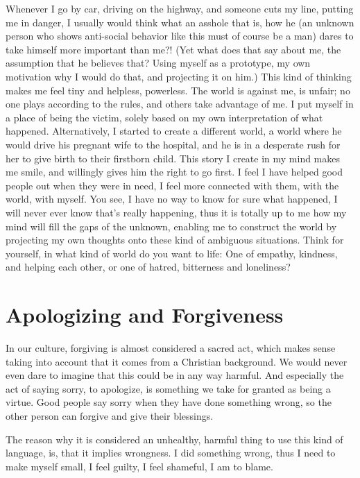 Whenever I go by car, driving on the highway, and someone cuts my line, putting me in danger, I usually would think what an asshole that is, how he (an unknown person who shows anti-social behavior like this must of course be a man) dares to take himself more important than me?!
(Yet what does that say about me, the assumption that he believes that?
Using myself as a prototype, my own motivation why I would do that, and projecting it on him.)
This kind of thinking makes me feel tiny and helpless, powerless.
The world is against me, is unfair; no one plays according to the rules, and others take advantage of me.
I put myself in a place of being the victim, solely based on my own interpretation of what happened.
Alternatively, I started to create a different world, a world where he would drive his pregnant wife to the hospital, and he is in a desperate rush for her to give birth to their firstborn child.
This story I create in my mind makes me smile, and willingly gives him the right to go first.
I feel I have helped good people out when they were in need, I feel more connected with them, with the world, with myself.
You see, I have no way to know for sure what happened, I will never ever know that's really happening, thus it is totally up to me how my mind will fill the gaps of the unknown, enabling me to construct the world by projecting my own thoughts onto these kind of ambiguous situations.
Think for yourself, in what kind of world do you want to life: One of empathy, kindness, and helping each other, or one of hatred, bitterness and loneliness?

\section{Apologizing and Forgiveness}\label{sec:apologizing-and-forgiveness}

In our culture, forgiving is almost considered a sacred act, which makes sense taking into account that it comes from a Christian background.
We would never even dare to imagine that this could be in any way harmful.
And especially the act of saying sorry, to apologize, is something we take for granted as being a virtue.
Good people say sorry when they have done something wrong, so the other person can forgive and give their blessings.

The reason why it is considered an unhealthy, harmful thing to use this kind of language, is, that it implies wrongness.
I did something wrong, thus I need to make myself small, I feel guilty, I feel shameful, I am to blame.

